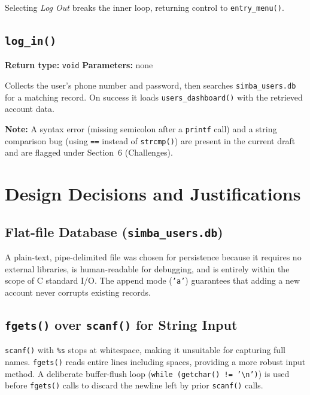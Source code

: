 \documentclass[12pt, a4paper]{article}
\begin{document}
Selecting \textit{Log Out} breaks the inner loop, returning control to \texttt{entry\_menu()}.

\subsection{\texttt{log\_in()}}

\textbf{Return type:} \texttt{void} \quad \textbf{Parameters:} none

Collects the user's phone number and password, then searches \texttt{simba\_users.db}
for a matching record. On success it loads \texttt{users\_dashboard()} with the retrieved
account data.

\begin{mdframed}[backgroundcolor=yellow!12, linecolor=black,
                 linewidth=1pt, innerleftmargin=10pt, innerrightmargin=10pt,
                 innertopmargin=8pt, innerbottommargin=8pt]
\textbf{Note:} A syntax error (missing semicolon after a \texttt{printf} call) and a string
comparison bug (using \texttt{==} instead of \texttt{strcmp()}) are present in the current
draft and are flagged under Section~6 (Challenges).
\end{mdframed}

\section{Design Decisions and Justifications}
\label{sec:design}

\subsection{Flat-file Database (\texttt{simba\_users.db})}

A plain-text, pipe-delimited file was chosen for persistence because it requires no external
libraries, is human-readable for debugging, and is entirely within the scope of C standard
I/O. The append mode (\texttt{'a'}) guarantees that adding a new account never corrupts
existing records.

\subsection{\texttt{fgets()} over \texttt{scanf()} for String Input}

\texttt{scanf()} with \texttt{\%s} stops at whitespace, making it unsuitable for capturing
full names. \texttt{fgets()} reads entire lines including spaces, providing a more robust
input method. A deliberate buffer-flush loop
(\texttt{while~(getchar()~!=~'\textbackslash n')}) is used before \texttt{fgets()} calls to
discard the newline left by prior \texttt{scanf()} calls.
\end{document}
